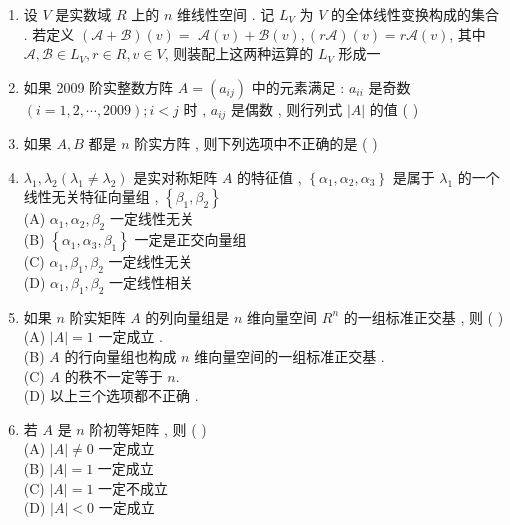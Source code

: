 \documentclass[10pt]{article}
\begin{document}
{\begin{enumerate}
  \item  设  $V$  是实数域  $R$  上的  $n$  维线性空间 .  记  $L_{V}$  为  $V$  的全体线性变换构成的集合 .  若定义  $(\mathscr{A}+\mathscr{B})(v)=$ $\mathscr{A}(v)+\mathscr{B}(v),(r \mathscr{A})(v)=r \mathscr{A}(v)$,  其中  $\mathscr{A}, \mathscr{B} \in L_{V}, r \in R, v \in V$,  则装配上这两种运算的  $L_{V}$  形成一 

  \item  如果  2009  阶实整数方阵  $A=\left(a_{i j}\right)$  中的元素满足 : $a_{i i}$  是奇数  $(i=1,2, \cdots, 2009) ; i<j$  时 , $a_{i j}$  是偶数 ,  则行列式  $|A|$  的值 ( )

  \item  如果  $A, B$  都是  $n$  阶实方阵 ,  则下列选项中不正确的是  ( )

  \item $\lambda_{1}, \lambda_{2}\left(\lambda_{1} \neq \lambda_{2}\right)$  是实对称矩阵  $A$  的特征值 , $\left\{\alpha_{1}, \alpha_{2}, \alpha_{3}\right\}$  是属于  $\lambda_{1}$  的一个线性无关特征向量组 , $\left\{\beta_{1}, \beta_{2}\right\}$\\
(A) $\alpha_{1}, \alpha_{2}, \beta_{2}$  一定线性无关 \\
(B) $\left\{\alpha_{1}, \alpha_{3}, \beta_{1}\right\}$  一定是正交向量组 \\
(C) $\alpha_{1}, \beta_{1}, \beta_{2}$  一定线性无关 \\
(D) $\alpha_{1}, \beta_{1}, \beta_{2}$  一定线性相关 

  \item  如果  $n$  阶实矩阵  $A$  的列向量组是  $n$  维向量空间  $R^{n}$  的一组标准正交基 ,  则 ( )\\
(A) $|A|=1$  一定成立 .\\
(B) $A$  的行向量组也构成  $n$  维向量空间的一组标准正交基 .\\
(C) $A$  的秩不一定等于  $n$.\\
(D)  以上三个选项都不正确 .

  \item  若  $A$  是  $n$  阶初等矩阵 ,  则  ( )\\
(A) $|A| \neq 0$  一定成立 \\
(B) $|A|=1$  一定成立 \\
(C) $|A|=1$  一定不成立 \\
(D) $|A|<0$  一定成立 


\end{enumerate}}
\end{document}

